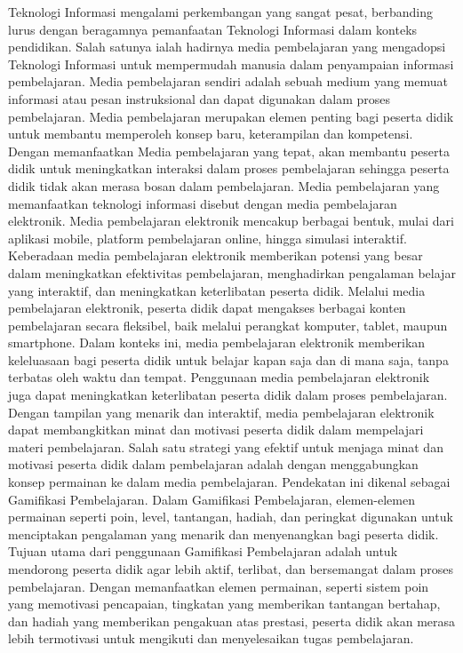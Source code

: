 Teknologi Informasi mengalami perkembangan yang sangat pesat, berbanding lurus dengan beragamnya pemanfaatan Teknologi Informasi dalam konteks pendidikan.
Salah satunya ialah hadirnya media pembelajaran yang mengadopsi Teknologi Informasi untuk mempermudah manusia dalam penyampaian informasi pembelajaran.
Media pembelajaran sendiri adalah sebuah medium yang memuat informasi atau pesan instruksional dan dapat digunakan dalam proses pembelajaran.
Media pembelajaran merupakan elemen penting bagi peserta didik untuk membantu memperoleh konsep baru, keterampilan dan kompetensi.
Dengan memanfaatkan Media pembelajaran yang tepat, akan membantu peserta didik untuk meningkatkan interaksi dalam proses pembelajaran 
sehingga peserta didik tidak akan merasa bosan dalam pembelajaran\cite{hasan2021media}.
Media pembelajaran yang memanfaatkan teknologi informasi disebut dengan media pembelajaran elektronik.
Media pembelajaran elektronik mencakup berbagai bentuk, mulai dari aplikasi mobile, platform pembelajaran online, hingga simulasi interaktif. 
Keberadaan media pembelajaran elektronik memberikan potensi yang besar dalam meningkatkan efektivitas pembelajaran, menghadirkan pengalaman belajar yang interaktif, dan meningkatkan keterlibatan peserta didik.
Melalui media pembelajaran elektronik, peserta didik dapat mengakses berbagai konten pembelajaran secara fleksibel, baik melalui perangkat komputer, tablet, maupun smartphone.
Dalam konteks ini, media pembelajaran elektronik memberikan keleluasaan bagi peserta didik untuk belajar kapan saja dan di mana saja, tanpa terbatas oleh waktu dan tempat. 
Penggunaan media pembelajaran elektronik juga dapat meningkatkan keterlibatan peserta didik dalam proses pembelajaran.
Dengan tampilan yang menarik dan interaktif, media pembelajaran elektronik dapat membangkitkan minat dan motivasi peserta didik dalam mempelajari materi pembelajaran. 
Salah satu strategi yang efektif untuk menjaga minat dan motivasi peserta didik dalam pembelajaran adalah dengan menggabungkan konsep permainan ke dalam media pembelajaran.
Pendekatan ini dikenal sebagai Gamifikasi Pembelajaran. Dalam Gamifikasi Pembelajaran, elemen-elemen permainan seperti poin, level, tantangan, hadiah, dan peringkat digunakan untuk menciptakan pengalaman yang menarik dan menyenangkan bagi peserta didik.
Tujuan utama dari penggunaan Gamifikasi Pembelajaran adalah untuk mendorong peserta didik agar lebih aktif, terlibat, dan bersemangat dalam proses pembelajaran.
Dengan memanfaatkan elemen permainan, seperti sistem poin yang memotivasi pencapaian, tingkatan yang memberikan tantangan bertahap, dan hadiah yang memberikan pengakuan atas prestasi, peserta didik akan merasa lebih termotivasi untuk mengikuti dan menyelesaikan tugas pembelajaran.

